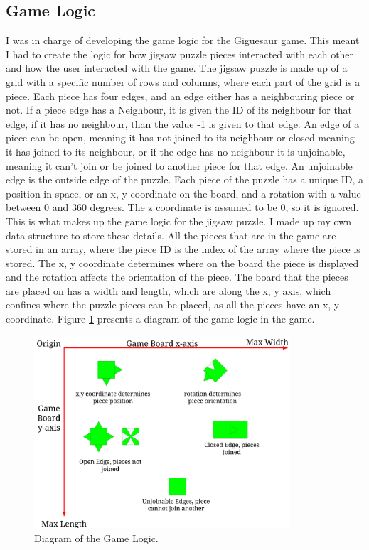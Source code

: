 \documentclass{article}
\begin{document}
\subsection{Game Logic}
I was in charge of developing the game logic for the Giguesaur game. This meant
I had to create the logic for how jigsaw puzzle pieces interacted with each
other and how the user interacted with the game. The jigsaw puzzle is made up of
a grid with a specific number of rows and columns, where each part of the grid
is a piece. Each piece has four edges, and an edge either has a neighbouring
piece or not. If a piece edge has a \gls{Neighbour}, it is given the ID of its
neighbour for that edge, if it has no neighbour, than the value -1 is given to
that edge. An edge of a piece can be open, meaning it has not joined to its
neighbour or closed meaning it has joined to its neighbour, or if the edge has
no neighbour it is unjoinable, meaning it can't join or be joined to another
piece for that edge. An unjoinable edge is the outside edge of the puzzle. Each
piece of the puzzle has a unique ID, a position in space, or an x, y coordinate
on the board, and a rotation with a value between 0 and 360 degrees. The z
coordinate is assumed to be 0, so it is ignored. This is what makes up the game
logic for the jigsaw puzzle. I made up my own data structure to store these
details. All the pieces that are in the game are stored in an array, where the
piece ID is the index of the array where the piece is stored. The x, y
coordinate determines where on the board the piece is displayed and the rotation
affects the orientation of the piece. The board that the pieces are placed on
has a width and length, which are along the x, y axis, which confines where the
puzzle pieces can be placed, as all the pieces have an x, y coordinate. Figure
\ref{fig:GameLogic} presents a diagram of the game logic in the game.

\begin{figure}[ht]
\begin{center}
\includegraphics[width=0.85\textwidth, center]{images/GameLogicDiagram}
\caption{Diagram of the Game Logic.}
\label{fig:GameLogic}
\end{center}
\end{figure}
\end{document}
